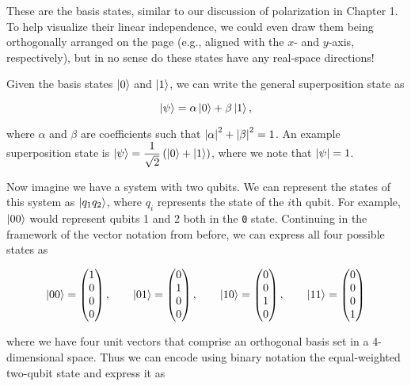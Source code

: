 \documentclass[12pt, english]{book}
\begin{document}
These are the basis states, similar to our discussion of polarization in Chapter 1.
To help visualize their linear independence, we could even draw them being orthogonally arranged on the page (e.g., aligned with the $x$- and $y$-axis, respectively), but in no sense do these states have any real-space directions!

Given the basis states $\ket{0}$ and $\ket{1}$, we can write the general superposition state as 

\begin{equation*}
	\ket{\psi} = \alpha \ket{0} + \beta \ket{1},
\end{equation*}

where $\alpha$ and $\beta$ are coefficients such that $\abs{\alpha}^2 + \abs{\beta}^2 = 1$.
An example superposition state is $\ket{\psi} = \dfrac{1}{\sqrt{2}} \left( \ket{0} + \ket{1} \right)$, where we note that $\abs{\psi} = 1$.

Now imagine we have a system with two qubits.
We can represent the states of this system as $\ket{q_1 q_2}$, where $q_i$ represents the state of the $i$th qubit.
For example, $\ket{00}$ would represent qubits 1 and 2 both in the \texttt{0} state.
Continuing in the framework of the vector notation from before, we can express all four possible states as

\begin{equation*}
	\ket{00} = \begin{pmatrix} 1 \\ 0 \\ 0 \\ 0 \end{pmatrix}, \qquad 
	\ket{01} = \begin{pmatrix} 0 \\ 1 \\ 0 \\ 0 \end{pmatrix}, \qquad 
	\ket{10} = \begin{pmatrix} 0 \\ 0 \\ 1 \\ 0 \end{pmatrix}, \qquad 
	\ket{11} = \begin{pmatrix} 0 \\ 0 \\ 0 \\ 1 \end{pmatrix}
\end{equation*}

where we have four unit vectors that comprise an orthogonal basis set in a 4-dimensional space.
Thus we can encode using binary notation the equal-weighted two-qubit state and express it as
\end{document}
